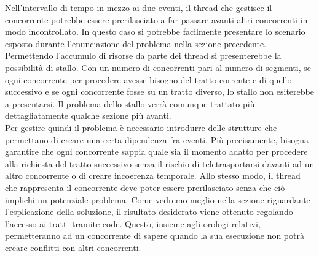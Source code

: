 Nell'intervallo
di tempo in mezzo ai due eventi, il thread che gestisce il concorrente potrebbe
essere prerilasciato a far passare avanti altri concorrenti
in modo incontrollato. In questo caso si potrebbe facilmente presentare lo
scenario esposto durante l'enunciazione del problema nella sezione
precedente.\\
Permettendo l'accumulo di risorse da parte dei thread si presenterebbe la
possibilità di stallo. Con un numero di concorrenti pari al numero di
segmenti, se ogni concorrente per procedere avesse bisogno del tratto corrente e
di quello successivo e se ogni concorrente
fosse su un tratto diverso, lo stallo non esiterebbe a presentarsi.
Il problema dello stallo verrà comunque trattato più dettagliatamente qualche
sezione più avanti.\\
Per gestire quindi il problema è necessario introdurre delle strutture che
permettano di creare una certa dipendenza fra eventi. Più precisamente,
bisogna garantire che ogni concorrente sappia quale sia il momento adatto per
procedere alla richiesta del tratto successivo senza il rischio
di teletrasportarsi davanti ad un altro concorrente o di creare incoerenza
temporale. Allo stesso modo, il thread che rappresenta il concorrente
deve poter essere prerilasciato senza che ciò implichi un potenziale problema.
Come vedremo meglio nella sezione riguardante l'esplicazione
della soluzione, il risultato desiderato viene ottenuto regolando l'accesso ai
tratti tramite code. Questo, insieme agli orologi relativi,
permetteranno ad un concorrente di sapere quando la sua esecuzione non potrà
creare conflitti con altri concorrenti.
